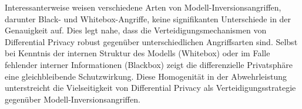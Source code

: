 Interessanterweise weisen verschiedene Arten von Modell-Inversionsangriffen, darunter Black- und Whitebox-Angriffe, keine signifikanten Unterschiede in der Genauigkeit auf. Dies legt nahe, dass die Verteidigungsmechanismen von Differential Privacy robust gegenüber unterschiedlichen Angriffsarten sind. Selbst bei Kenntnis der internen Struktur des Modells (Whitebox) oder im Falle fehlender interner Informationen (Blackbox) zeigt die differenzielle Privatsphäre eine gleichbleibende Schutzwirkung. Diese Homogenität in der Abwehrleistung unterstreicht die Vielseitigkeit von Differential Privacy als Verteidigungsstrategie gegenüber Modell-Inversionsangriffen.

